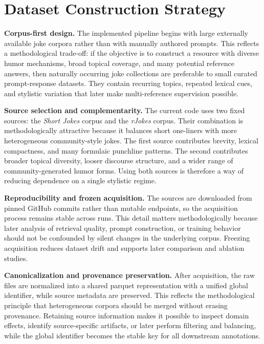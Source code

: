 \documentclass[11pt]{article}
\begin{document}
\section{Dataset Construction Strategy}

\textbf{Corpus-first design.} The implemented pipeline begins with large externally available joke corpora rather than with manually authored prompts. This reflects a methodological trade-off: if the objective is to construct a resource with diverse humor mechanisms, broad topical coverage, and many potential reference answers, then naturally occurring joke collections are preferable to small curated prompt-response datasets. They contain recurring topics, repeated lexical cues, and stylistic variation that later make multi-reference supervision possible.

\textbf{Source selection and complementarity.} The current code uses two fixed sources: the \emph{Short Jokes} corpus and the \emph{rJokes} corpus. Their combination is methodologically attractive because it balances short one-liners with more heterogeneous community-style jokes. The first source contributes brevity, lexical compactness, and many formulaic punchline patterns. The second contributes broader topical diversity, looser discourse structure, and a wider range of community-generated humor forms. Using both sources is therefore a way of reducing dependence on a single stylistic regime.

\textbf{Reproducibility and frozen acquisition.} The sources are downloaded from pinned GitHub commits rather than mutable endpoints, so the acquisition process remains stable across runs. This detail matters methodologically because later analysis of retrieval quality, prompt construction, or training behavior should not be confounded by silent changes in the underlying corpus. Freezing acquisition reduces dataset drift and supports later comparison and ablation studies.

\textbf{Canonicalization and provenance preservation.} After acquisition, the raw files are normalized into a shared parquet representation with a unified global identifier, while source metadata are preserved. This reflects the methodological principle that heterogeneous corpora should be merged without erasing provenance. Retaining source information makes it possible to inspect domain effects, identify source-specific artifacts, or later perform filtering and balancing, while the global identifier becomes the stable key for all downstream annotations.
\end{document}
